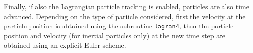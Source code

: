 Finally, if also the Lagrangian particle tracking is enabled, particles are also time advanced.
Depending on the type of particle considered, first the velocity at the particle position is obtained using the subroutine \texttt{lagran4}, then the particle position and velocity (for inertial particles only) at the new time step are obtained using an explicit Euler scheme.
